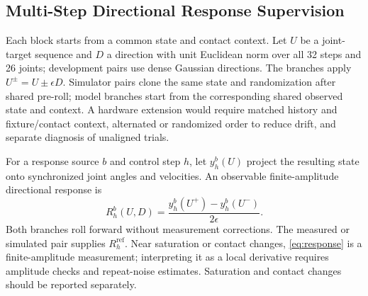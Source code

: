 \documentclass[letterpaper,10pt,conference]{ieeeconf}
\begin{document}
\subsection{Multi-Step Directional Response Supervision}
Each block starts from a common state and contact context. Let $U$ be a joint-target sequence and $D$ a direction with unit Euclidean norm over all 32 steps and 26 joints; development pairs use dense Gaussian directions. The branches apply $U^\pm=U\pm\epsilon D$. Simulator pairs clone the same state and randomization after shared pre-roll; model branches start from the corresponding shared observed state and context. A hardware extension would require matched history and fixture/contact context, alternated or randomized order to reduce drift, and separate diagnosis of unaligned trials.

For a response source $b$ and control step $h$, let $y_h^b(U)$ project the resulting state onto synchronized joint angles and velocities. An observable finite-amplitude directional response is
\begin{equation}\label{eq:response}
  R_h^b(U,D) = \frac{y_h^b(U^+)-y_h^b(U^-)}{2\epsilon} .
\end{equation}
Both branches roll forward without measurement corrections. The measured or simulated pair supplies $R_h^{\mathrm{ref}}$. Near saturation or contact changes, \eqref{eq:response} is a finite-amplitude measurement; interpreting it as a local derivative requires amplitude checks and repeat-noise estimates. Saturation and contact changes should be reported separately.
\end{document}
